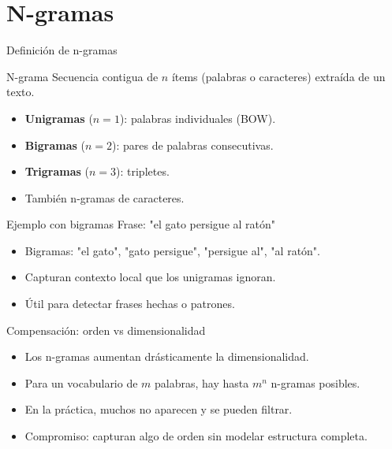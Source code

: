 \documentclass[aspectratio=169, 10pt, xcolor=table]{beamer}
\begin{document}
\section{N-gramas}

\begin{frame}{Definición de n-gramas}
    \begin{block}{N-grama}
        Secuencia contigua de $n$ ítems (palabras o caracteres) extraída de un texto.
    \end{block}
    \begin{itemize}
        \item \textbf{Unigramas} ($n=1$): palabras individuales (BOW).
        \item \textbf{Bigramas} ($n=2$): pares de palabras consecutivas.
        \item \textbf{Trigramas} ($n=3$): tripletes.
        \item También n-gramas de caracteres.
    \end{itemize}
\end{frame}

\begin{frame}{Ejemplo con bigramas}
    Frase: "el gato persigue al ratón"
    \begin{itemize}
        \item Bigramas: "el gato", "gato persigue", "persigue al", "al ratón".
        \item Capturan contexto local que los unigramas ignoran.
        \item Útil para detectar frases hechas o patrones.
    \end{itemize}
\end{frame}

\begin{frame}{Compensación: orden vs dimensionalidad}
    \begin{itemize}
        \item Los n-gramas aumentan drásticamente la dimensionalidad.
        \item Para un vocabulario de $m$ palabras, hay hasta $m^n$ n-gramas posibles.
        \item En la práctica, muchos no aparecen y se pueden filtrar.
        \item Compromiso: capturan algo de orden sin modelar estructura completa.
    \end{itemize}
\end{frame}
\end{document}
